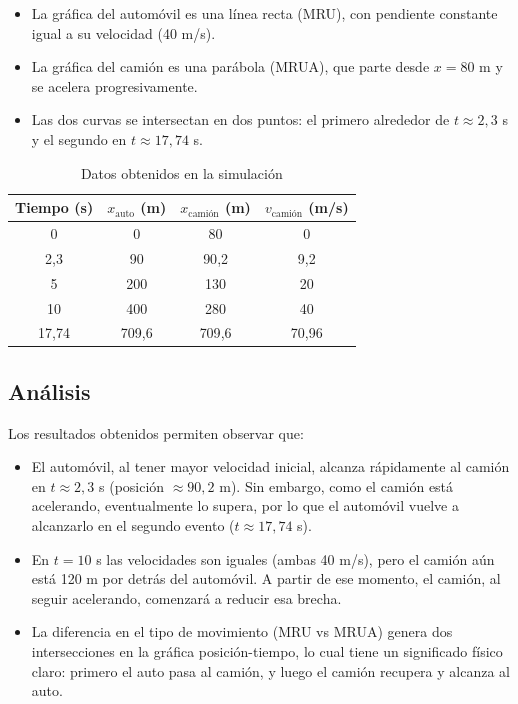 \begin{itemize}
    \item La gráfica del automóvil es una línea recta (MRU), con pendiente constante igual a su velocidad (40 m/s).
    \item La gráfica del camión es una parábola (MRUA), que parte desde $x = 80$ m y se acelera progresivamente.
    \item Las dos curvas se intersectan en dos puntos: el primero alrededor de $t \approx 2{,}3$ s y el segundo en $t \approx 17{,}74$ s.
\end{itemize}

\begin{table}[H]
\centering
\begin{tabular}{c|c|c|c}
Tiempo (s) & $x_{\text{auto}}$ (m) & $x_{\text{camión}}$ (m) & $v_{\text{camión}}$ (m/s) \\\hline
0   & 0     & 80    & 0  \\
2{,}3 & 90  & 90{,}2 & 9{,}2 \\
5   & 200   & 130   & 20 \\
10  & 400   & 280   & 40 \\
17{,}74 & 709{,}6 & 709{,}6 & 70{,}96 \\
\end{tabular}
\caption{Datos obtenidos en la simulación}
\end{table}

\vspace{-20pt}

\subsection{Análisis}

Los resultados obtenidos permiten observar que:

\begin{itemize}
    \item El automóvil, al tener mayor velocidad inicial, alcanza rápidamente al camión en $t \approx 2{,}3$ s (posición $\approx 90{,}2$ m). Sin embargo, como el camión está acelerando, eventualmente lo supera, por lo que el automóvil vuelve a alcanzarlo en el segundo evento ($t \approx 17{,}74$ s).
    \item En $t = 10$ s las velocidades son iguales (ambas 40 m/s), pero el camión aún está 120 m por detrás del automóvil. A partir de ese momento, el camión, al seguir acelerando, comenzará a reducir esa brecha.
    \item La diferencia en el tipo de movimiento (MRU vs MRUA) genera dos intersecciones en la gráfica posición-tiempo, lo cual tiene un significado físico claro: primero el auto pasa al camión, y luego el camión recupera y alcanza al auto.
\end{itemize}

